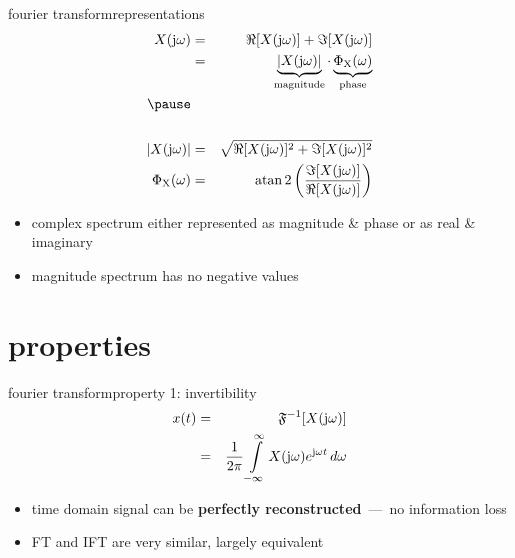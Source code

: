         \begin{frame}{fourier transform}{representations}
            \vspace{-5mm}
            \begin{eqnarray*}
                X(\jom) &=& \Re[X(\jom)] + \Im[X(\jom)]\\
                &=& \underbrace{|X(\jom)|}_{\text{magnitude}} \cdot \underbrace{\Phi_\mathrm{X}(\omega)}_{\text{phase}}\\
%
                \pause
                &&\\
                &&\\
                \bigskip
                |X(\jom)|  &=& \sqrt{\Re[X(\jom)]^2 + \Im[X(\jom)]^2}\\
                \Phi_\mathrm{X}(\omega)  &=& \atan2\left(\frac{\Im[X(\jom)]}{\Re[X(\jom)]}\right)
            \end{eqnarray*}

            \bigskip
            \begin{itemize}
                \item<2->   complex spectrum either represented as magnitude \& phase or as real \& imaginary
                \item<2->   magnitude spectrum has no negative values
            \end{itemize}
        \end{frame}	
    
    \section{properties}
        \begin{frame}{fourier transform}{property 1: invertibility}
            \begin{eqnarray*}\label{eq:ift}
                x(t) &=& \mathfrak{F}^{-1}[X(\mathrm{j}\omega)]\nonumber\\
                 &=& \frac{1}{2\pi}\int\limits_{-\infty}^{\infty} X(\mathrm{j}\omega) {e}^{\mathrm{j}\omega t}\, d\omega 
            \end{eqnarray*}

            \bigskip
            \begin{itemize}
                \item<2->   time domain signal can be \textbf{perfectly reconstructed}~---~no information loss
                \item<2->   FT and IFT are very similar, largely equivalent
            \end{itemize}
        \end{frame}	

